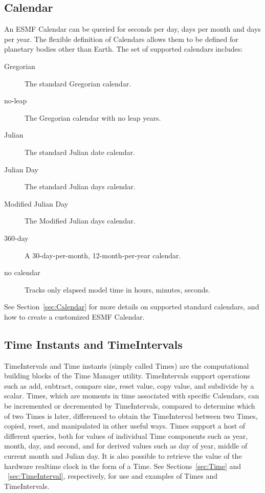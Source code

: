 \subsection{Calendar}
An ESMF Calendar can be queried for seconds per day, days per month 
and days per year.  The flexible definition of Calendars allows them
to be defined for planetary bodies other than Earth.  The set of supported 
calendars includes:
\begin{description}
\item [Gregorian] The standard Gregorian calendar.
\item [no-leap] The Gregorian calendar with no leap years.
\item [Julian] The standard Julian date calendar.
\item [Julian Day] The standard Julian days calendar.
\item [Modified Julian Day] The Modified Julian days calendar.
\item [360-day] A 30-day-per-month, 12-month-per-year calendar.
\item [no calendar] Tracks only elapsed model time in hours, minutes, seconds.
\end{description}
See Section~\ref{sec:Calendar} for more details on supported standard 
calendars, and how to create a customized ESMF Calendar.

\subsection{Time Instants and TimeIntervals}

\label{subsec:Time Instants and TimeIntervals}
TimeIntervals and Time instants (simply called Times) are the computational 
building blocks of the Time Manager utility.  TimeIntervals support operations
such as add, subtract, compare size, reset value, copy value, and subdivide
by a scalar.  Times, which are moments in time associated with specific
Calendars, can be incremented or decremented by TimeIntervals, compared to
determine which of two Times is later, differenced to obtain the TimeInterval
between two Times, copied, reset, and manipulated in other useful ways.
Times support a host of different queries, both for values of individual Time 
components such as year, month, day, and second, and for derived values such 
as day of year, middle of current month and Julian day.  It is also possible 
to retrieve the value of the hardware realtime clock in the form of a 
Time.  See Sections~\ref{sec:Time} and ~\ref{sec:TimeInterval}, respectively,
for use and examples of Times and TimeIntervals.

